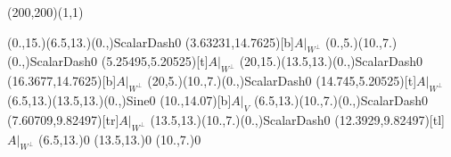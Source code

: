\unitlength=1bp%

\begin{feynartspicture}(200,200)(1,1)

\FADiagram{}
\FAProp(0.,15.)(6.5,13.)(0.,){ScalarDash}{0}
\FALabel(3.63231,14.7625)[b]{$A|_{W^\perp}$}
\FAProp(0.,5.)(10.,7.)(0.,){ScalarDash}{0}
\FALabel(5.25495,5.20525)[t]{$A|_{W^\perp}$}
\FAProp(20,15.)(13.5,13.)(0.,){ScalarDash}{0}
\FALabel(16.3677,14.7625)[b]{$A|_{W^\perp}$}
\FAProp(20,5.)(10.,7.)(0.,){ScalarDash}{0}
\FALabel(14.745,5.20525)[t]{$A|_{W^\perp}$}
\FAProp(6.5,13.)(13.5,13.)(0.,){Sine}{0}
\FALabel(10.,14.07)[b]{$A|_V$}
\FAProp(6.5,13.)(10.,7.)(0.,){ScalarDash}{0}
\FALabel(7.60709,9.82497)[tr]{$A|_{W^\perp}$}
\FAProp(13.5,13.)(10.,7.)(0.,){ScalarDash}{0}
\FALabel(12.3929,9.82497)[tl]{$A|_{W^\perp}$}
\FAVert(6.5,13.){0}
\FAVert(13.5,13.){0}
\FAVert(10.,7.){0}
\end{feynartspicture}


